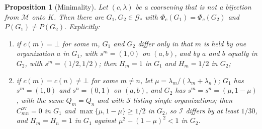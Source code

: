 \documentclass[11pt,letterpaper]{article}
\newtheorem{proposition}[theorem]{Proposition}
\theoremstyle{definition}
\theoremstyle{remark}
\newcommand{\Mset}{\mathcal{M}}
\newcommand{\Integ}{\mathcal{I}}
\newcommand{\ov}{\mathrm{ov}}
\begin{document}
\begin{proposition}[Minimality]
\label{prop:formalized-state:minimality6}
Let $(c,\lambda)$ be a coarsening that is not a bijection from $\Mset$ onto $K$. Then there are $G_1,G_2\in\mathcal{G}_*$ with $\Phi_c(G_1)=\Phi_c(G_2)$ and $P(G_1)\neq P(G_2)$. Explicitly:
\begin{enumerate}[label=(\alph*)]
\item if $c(m)=\bot$ for some $m$, $G_1$ and $G_2$ differ only in that $m$ is held by one organization $a$ in $G_1$, with $s^m=(1,0)$ on $(a,b)$, and by $a$ and $b$ equally in $G_2$, with $s^m=(1/2,1/2)$; then $H_m=1$ in $G_1$ and $H_m=1/2$ in $G_2$;
\item if $c(m)=c(n)\neq\bot$ for some $m\neq n$, let $\mu=\lambda_m/(\lambda_m+\lambda_n)$; $G_1$ has $s^m=(1,0)$ and $s^n=(0,1)$ on $(a,b)$, and $G_2$ has $s^m=s^n=(\mu,1-\mu)$, with the same $Q_m=Q_n$ and with $\mathcal{S}$ listing single organizations; then $C^{\ov}_{mn}=0$ in $G_1$ and $\max\{\mu,1-\mu\}\ge1/2$ in $G_2$, so $\Integ$ differs by at least $1/30$, and $H_m=H_n=1$ in $G_1$ against $\mu^2+(1-\mu)^2<1$ in $G_2$.
\end{enumerate}
\end{proposition}
\end{document}
